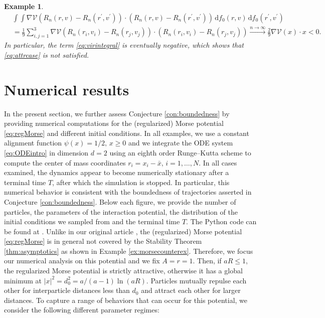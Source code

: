 \documentclass[11pt]{article}
\newtheorem{example}[theorem]{Example}
\newcommand{\abs}[1]{\left| #1 \right|}
\newcommand{\msolinit}[1]{f_0(#1)}
\begin{document}
\begin{bibunit}[unsrtnat]
\begin{example}
\begin{align}
            &\int \int \nabla \mathcal{V}(R_n(r,v) - R_n(r^\prime, v^\prime)) \cdot (R_n(r, v) -R_n(r^\prime, v^\prime)) \, \mathrm{d} \msolinit{r,v} \, \mathrm{d}\msolinit{r^\prime, v^\prime} \label{eq:virintegral} \\ 
            &= \frac{1}{9} \sum_{i, j = 1}^3  \nabla \mathcal{V} (R_n(r_i,v_i) - R_n(r_j, v_j)) \cdot (R_n(r_i, v_i) - R_n(r_j, v_j)) \stackrel{n \to \infty}{\to } \frac{2}{9} \nabla \mathcal{V}(x) \cdot x < 0 . \nonumber
        \end{align}
        In particular, the term \eqref{eq:virintegral} is eventually negative, which shows that \eqref{eq:attrcase} is not satisfied.
    \end{example}

    \section{Numerical results} \label{sec:numerics}
In the present section, we further assess Conjecture \ref{con:boundedness} by providing numerical computations for the (regularized) Morse potential \eqref{eq:regMorse} and different initial conditions.
In all examples, we use a constant alignment function $\psi(x) = 1/{2}, \, x \geq 0$ and we integrate the ODE system \eqref{eq:ODEintro} in dimension $d=2$ using an eighth order Runge--Kutta scheme to compute the center of mass coordinates $r_i = x_i - \bar{x}, \, i = 1, \ldots, N$. In all cases examined, the dynamics appear to become numerically stationary after a terminal time $T$, after which the simulation is stopped. In particular, this numerical behavior is consistent with the boundedness of trajectories asserted in Conjecture \ref{con:boundedness}. Below each figure, we provide the number of particles, the parameters of the interaction potential, the distribution of the initial conditions we sampled from and the terminal time $T$. The Python code can be found at \cite{Zenodofiles}.
Unlike in our original article \cite[Example $3.9$]{JaTo2024}, the (regularized) Morse potential \eqref{eq:regMorse} is in general not covered by the Stability Theorem \ref{thm:asymptotics} as shown in Example \ref{ex:morsecounterex}. Therefore, we focus our numerical analysis on this potential and we fix $A=r=1$. Then, if $aR \leq 1$, the regularized Morse potential is strictly attractive, otherwise it has a global minimum at $\abs{x}^2 = d_0^2 = a /{(a-1)} \ln(aR)$.  
Particles mutually repulse each other for interparticle distances less than $d_0$ and attract each other for larger distances.
To capture a range of behaviors that can occur for this potential, we consider the following different parameter regimes:

\end{bibunit}
\end{document}
